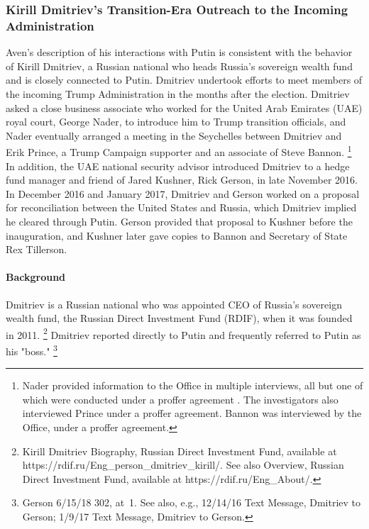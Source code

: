 \subsubsection{Kirill Dmitriev's Transition-Era Outreach to the Incoming Administration}

Aven's description of his interactions with Putin is consistent with the behavior of Kirill Dmitriev, a Russian national who heads Russia's sovereign wealth fund and is closely connected to Putin.
Dmitriev undertook efforts to meet members of the incoming Trump Administration in the months after the election.
Dmitriev asked a close business associate who worked for the United Arab Emirates (UAE) royal court, George Nader, to introduce him to Trump transition officials, and Nader eventually arranged a meeting in the Seychelles between Dmitriev and Erik Prince, a Trump Campaign supporter and an associate of Steve Bannon.%
\footnote{Nader provided information to the Office in multiple interviews, all but one of which were conducted under a proffer agreement .
The investigators also interviewed Prince under a proffer agreement.
Bannon was interviewed by the Office,  under a proffer agreement.}
In addition, the UAE national security advisor introduced Dmitriev to a hedge fund manager and friend of Jared Kushner, Rick Gerson, in late November 2016.
In December 2016 and January 2017, Dmitriev and Gerson worked on a proposal for reconciliation between the United States and Russia, which Dmitriev implied he cleared through Putin.
Gerson provided that proposal to Kushner before the inauguration, and Kushner later gave copies to Bannon and Secretary of State Rex Tillerson.

\paragraph{Background}

Dmitriev is a Russian national who was appointed CEO of Russia's sovereign wealth fund, the Russian Direct Investment Fund (RDIF), when it was founded in 2011.%
\footnote{Kirill Dmitriev Biography, Russian Direct Investment Fund, available at https://rdif.ru/Eng\_person\_dmitriev\_kirill/.
See also Overview, Russian Direct Investment Fund, available at https://rdif.ru/Eng\_About/.}
Dmitriev reported directly to Putin and frequently referred to Putin as his "boss."%
\footnote{Gerson 6/15/18 302, at~1.
See also, e.g., 12/14/16 Text Message, Dmitriev to Gerson;
1/9/17 Text Message, Dmitriev to Gerson.}

